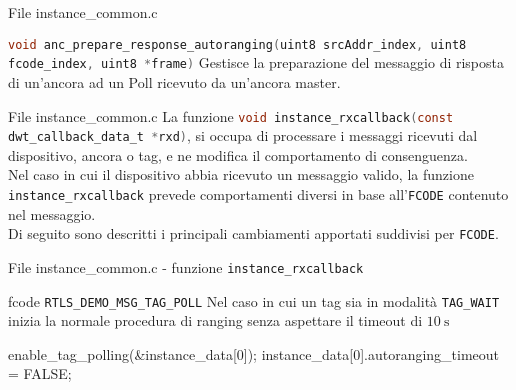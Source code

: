 \begin{frame}{File instance\_common.c}
  \begin{block}{\lstinline[language=C]!void anc_prepare_response_autoranging(uint8 srcAddr_index, uint8 fcode_index, uint8 *frame)! \newfunction}
    Gestisce la preparazione del messaggio di risposta di un'ancora ad un Poll ricevuto da un'ancora master.
  \end{block}
\end{frame}

\begin{frame}{File instance\_common.c}
  La funzione \lstinline[language=C]!void instance_rxcallback(const dwt_callback_data_t *rxd)!,
  si occupa di processare i messaggi ricevuti dal dispositivo,
  ancora o tag, e ne modifica il comportamento di consenguenza.\\
  Nel caso in cui il dispositivo abbia ricevuto un messaggio valido, la funzione \lstinline[language=C]!instance_rxcallback!
  prevede comportamenti diversi in base all'\lstinline[language=C]!FCODE! contenuto nel messaggio.\\
  Di seguito sono descritti i principali \alert{cambiamenti} apportati suddivisi
  per \lstinline[language=C]!FCODE!.
\end{frame}

\begin{frame}[fragile]{File instance\_common.c - funzione \lstinline[language=C]!instance_rxcallback!}
  \begin{block}{fcode \lstinline[language=C]!RTLS_DEMO_MSG_TAG_POLL!}
    Nel caso in cui un tag sia in modalità \lstinline[language=C]!TAG_WAIT! inizia la normale procedura di ranging senza aspettare il timeout di $\SI{10}{\second}$
    \begin{C}
      enable_tag_polling(&instance_data[0]);
      instance_data[0].autoranging_timeout = FALSE;
    \end{C}
  \end{block}
\end{frame}

